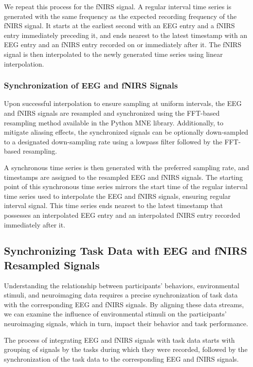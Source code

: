 We repeat this process for the fNIRS signal. A regular interval time series is generated with the same frequency as the expected recording frequency of the fNIRS signal. It starts at the earliest second with an EEG entry and a fNIRS entry immediately preceding it, and ends nearest to the latest timestamp with an EEG entry and an fNIRS entry recorded on or immediately after it. The fNIRS signal is then interpolated to the newly generated time series using linear interpolation.

\subsubsection{Synchronization of EEG and fNIRS Signals}


Upon successful interpolation to ensure sampling at uniform intervals, the EEG and fNIRS signals are resampled and synchronized using the FFT-based resampling method available in the Python MNE library. Additionally, to mitigate aliasing effects, the synchronized signals can be optionally down-sampled to a designated down-sampling rate using a lowpass filter followed by the FFT-based resampling.

A synchronous time series is then generated with the preferred sampling rate, and timestamps are assigned to the resampled EEG and fNIRS signals. The starting point of this synchronous time series mirrors the start time of the regular interval time series used to interpolate the EEG and fNIRS signals, ensuring regular interval signal. This time series ends nearest to the latest timestamp that possesses an interpolated EEG entry and an interpolated fNIRS entry recorded immediately after it.

\subsection{Synchronizing Task Data with EEG and fNIRS Resampled Signals}

Understanding the relationship between participants' behaviors, environmental stimuli, and neuroimaging data requires a precise synchronization of task data with the corresponding EEG and fNIRS signals. By aligning these data streams, we can examine the influence of environmental stimuli on the participants' neuroimaging signals, which in turn, impact their behavior and task performance.

The process of integrating EEG and fNIRS signals with task data starts with grouping of signals by the tasks during which they were recorded, followed by the synchronization of the task data to the corresponding EEG and fNIRS signals.

